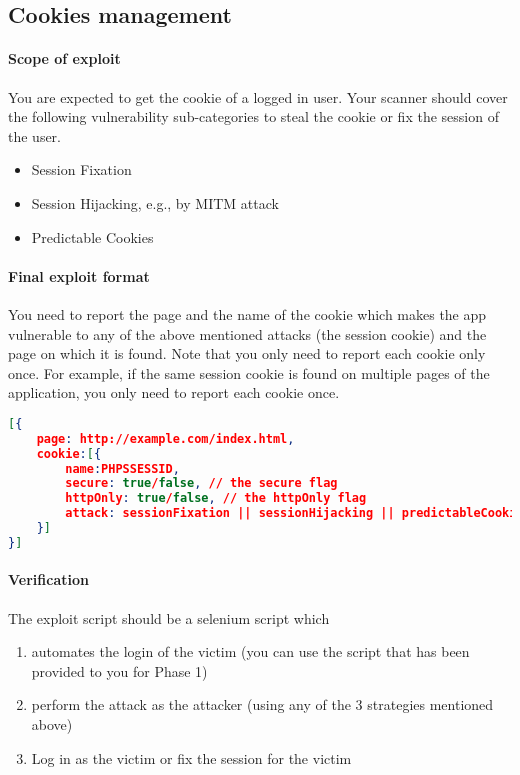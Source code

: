 \documentclass{article}[10pt]
\begin{document}

\subsection{Cookies management}
\paragraph{Scope of exploit}
You are expected to get the cookie of a logged in user. Your scanner should cover the following vulnerability sub-categories to steal the cookie or fix the session of the user.
	\begin{itemize}
		\item Session Fixation
		\item Session Hijacking, e.g., by MITM attack
		\item Predictable Cookies
	\end{itemize}

\paragraph{Final exploit format}
You need to report the page and the name of the cookie which makes the app vulnerable to any of the above mentioned attacks (the session cookie) and the page on which it is found. Note that you only need to report each cookie only once. For example, if the same session cookie is found on multiple pages of the application, you only need to report each cookie once. 

\begin{lstlisting}[language=json,firstnumber=1]
[{
	page: http://example.com/index.html,
	cookie:[{
		name:PHPSSESSID,
		secure: true/false, // the secure flag
		httpOnly: true/false, // the httpOnly flag
		attack: sessionFixation || sessionHijacking || predictableCookies
	}]
}]
\end{lstlisting}

\paragraph{Verification}
The exploit script should be a selenium script which
\begin{enumerate}
\item automates the login of the victim (you can use the script that has been provided to you for Phase 1)
\item perform the attack as the attacker (using any of the 3 strategies mentioned above)
\item Log in as the victim or fix the session for the victim
\end{enumerate}
\end{document}
